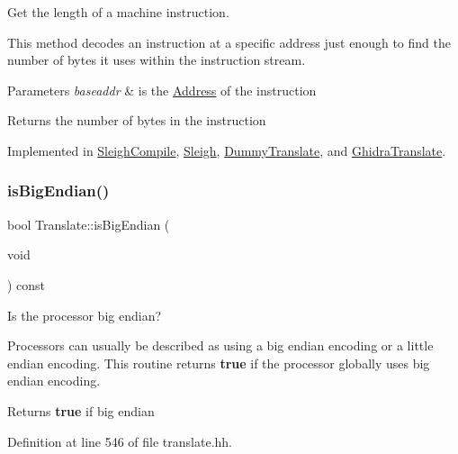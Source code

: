 Get the length of a machine instruction. 

This method decodes an instruction at a specific address just enough to find the number of bytes it uses within the instruction stream. 
\begin{DoxyParams}{Parameters}
{\em baseaddr} & is the \mbox{\hyperlink{class_address}{Address}} of the instruction \\
\hline
\end{DoxyParams}
\begin{DoxyReturn}{Returns}
the number of bytes in the instruction 
\end{DoxyReturn}


Implemented in \mbox{\hyperlink{class_sleigh_compile_acec92daa9826ded3fe156d2b58ccc2ca}{Sleigh\+Compile}}, \mbox{\hyperlink{class_sleigh_aec2a92a6246fd8d2704d1f853f01ee85}{Sleigh}}, \mbox{\hyperlink{class_dummy_translate_aaf7ead6c5f833e5558319725ad66fe28}{Dummy\+Translate}}, and \mbox{\hyperlink{class_ghidra_translate_a5935212f2ea8435a9df1b8e39020d04f}{Ghidra\+Translate}}.

\mbox{\label{class_translate_acd3fd0f02883a26e882c46872324adb8}} 
\subsubsection{\texorpdfstring{isBigEndian()}{isBigEndian()}}
{\footnotesize\ttfamily bool Translate\+::is\+Big\+Endian (\begin{DoxyParamCaption}\item[{void}]{ }\end{DoxyParamCaption}) const\hspace{0.3cm}{\ttfamily [inline]}}



Is the processor big endian? 

Processors can usually be described as using a big endian encoding or a little endian encoding. This routine returns {\bfseries{true}} if the processor globally uses big endian encoding. \begin{DoxyReturn}{Returns}
{\bfseries{true}} if big endian 
\end{DoxyReturn}


Definition at line 546 of file translate.\+hh.

